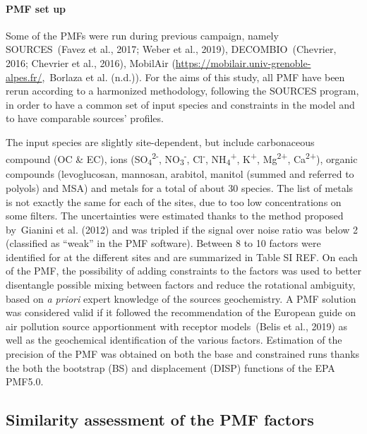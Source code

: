 \documentclass[
]{article}
\begin{document}
\hypertarget{pmf-set-up}{%
\paragraph{PMF set up}\label{pmf-set-up}}

Some of the PMFs were run during previous campaign, namely
SOURCES~(Favez et al., 2017; Weber et al., 2019), DECOMBIO~(Chevrier,
2016; Chevrier et al., 2016), MobilAir
(\url{https://mobilair.univ-grenoble-alpes.fr/},~Borlaza et al. (n.d.)).
For the aims of this study, all PMF have been rerun according to a
harmonized methodology, following the SOURCES program, in order to have
a common set of input species and constraints in the model and to have
comparable sources' profiles.

The input species are slightly site-dependent, but include carbonaceous
compound (OC \& EC), ions (SO\textsubscript{4}\textsuperscript{2-},
NO\textsubscript{3}\textsuperscript{-}, Cl\textsuperscript{-},
NH\textsubscript{4}\textsuperscript{+}, K\textsuperscript{+},
Mg\textsuperscript{2+}, Ca\textsuperscript{2+}), organic compounds
(levoglucosan, mannosan, arabitol, manitol (summed and referred to
polyols) and MSA) and metals for a total of about 30 species. The list
of metals is not exactly the same for each of the sites, due to too low
concentrations on some filters. The uncertainties were estimated thanks
to the method proposed by~Gianini et al. (2012) and was tripled if the
signal over noise ratio was below 2 (classified as ``weak'' in the PMF
software). Between 8 to 10 factors were identified for at the different
sites and are summarized in Table SI REF. On each of the PMF, the
possibility of adding constraints to the factors was used to better
disentangle possible mixing between factors and reduce the rotational
ambiguity, based on \emph{a priori} expert knowledge of the sources
geochemistry. A PMF solution was considered valid if it followed the
recommendation of the European guide on air pollution source
apportionment with receptor models~(Belis et al., 2019) as well as the
geochemical identification of the various factors. Estimation of the
precision of the PMF was obtained on both the base and constrained runs
thanks the both the bootstrap (BS) and displacement (DISP) functions of
the EPA PMF5.0.

\hypertarget{similarity-assessment-of-the-pmf-factors}{%
\subsection{Similarity assessment of the PMF
factors}\label{similarity-assessment-of-the-pmf-factors}}
\end{document}
